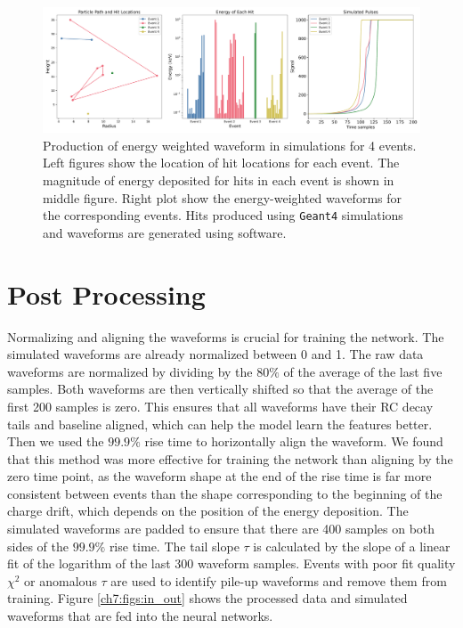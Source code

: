 \begin{figure}[htb!]
    \includegraphics[width=0.99\linewidth,trim={1pc 0pc 1pc 0pc},clip]{ch7/figs/hit_sims.pdf}
    \caption{Production of energy weighted waveform in simulations for 4 events. Left figures show the location of hit locations for each event.  The magnitude of energy deposited for hits in each event is shown in middle figure. Right plot show the energy-weighted waveforms for the corresponding events. Hits produced using \texttt{Geant4} simulations and waveforms are generated using {\siggen} software.}
   \label{ch7_fig_eng_dep_sim}
\end{figure}

\section{Post Processing}
Normalizing and aligning the waveforms is crucial for training the network. The simulated waveforms are already normalized between 0 and 1. The raw data waveforms are normalized by dividing by the $80\%$ of the average of the last five samples. Both waveforms are then vertically shifted so that the average of the first 200 samples is zero. This ensures that all waveforms have their RC decay tails and baseline aligned, which can help the model learn the features better. Then we used the $99.9\%$ rise time to horizontally align the waveform. We found that this method was more effective for training the network than aligning by the zero time point, as the waveform shape at the end of the rise time is far more consistent between events than the shape corresponding to the beginning of the charge drift, which depends on the position of the energy deposition. The simulated waveforms are padded to ensure that there are 400 samples on both sides of the $99.9\%$ rise time. The tail slope $\tau$ is calculated by the slope of a linear fit of the logarithm of the last 300 waveform samples. Events with poor fit quality $\chi^2$ or anomalous $\tau$ are used to identify pile-up waveforms and remove them from training. Figure \ref{ch7:figs:in_out} shows the processed data and simulated waveforms that are fed into the neural networks.

